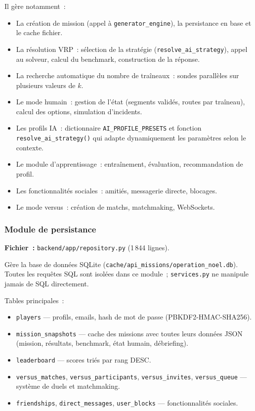\documentclass[a4paper, 12pt, twoside]{article}
\begin{document}
Il g\`{e}re notamment~:
\begin{itemize}
  \item La cr\'{e}ation de mission (appel \`{a} \texttt{generator\_engine}), la persistance en base et le cache fichier.
  \item La r\'{e}solution VRP~: s\'{e}lection de la strat\'{e}gie (\texttt{resolve\_ai\_strategy}), appel au solveur, calcul du benchmark, construction de la r\'{e}ponse.
  \item La recherche automatique du nombre de tra\^{i}neaux~: sondes parall\`{e}les sur plusieurs valeurs de $k$.
  \item Le mode humain~: gestion de l'\'{e}tat (segments valid\'{e}s, routes par tra\^{i}neau), calcul des options, simulation d'incidents.
  \item Les profils IA~: dictionnaire \texttt{AI\_PROFILE\_PRESETS} et fonction \texttt{resolve\_ai\_strategy()} qui adapte dynamiquement les param\`{e}tres selon le contexte.
  \item Le module d'apprentissage~: entra\^{i}nement, \'{e}valuation, recommandation de profil.
  \item Les fonctionnalit\'{e}s sociales~: amiti\'{e}s, messagerie directe, blocages.
  \item Le mode versus~: cr\'{e}ation de matchs, matchmaking, WebSockets.
\end{itemize}

\subsubsection{Module de persistance}

\textbf{Fichier~:} \texttt{backend/app/repository.py} (1\,844 lignes).

G\`{e}re la base de donn\'{e}es SQLite (\texttt{cache/api\_missions/operation\_noel.db}).
Toutes les requ\^{e}tes SQL sont isol\'{e}es dans ce module~; \texttt{services.py} ne
manipule jamais de SQL directement.

Tables principales~:
\begin{itemize}
  \item \texttt{players} --- profils, emails, hash de mot de passe (PBKDF2-HMAC-SHA256).
  \item \texttt{mission\_snapshots} --- cache des missions avec toutes leurs donn\'{e}es JSON (mission, r\'{e}sultats, benchmark, \'{e}tat humain, d\'{e}briefing).
  \item \texttt{leaderboard} --- scores tri\'{e}s par rang DESC.
  \item \texttt{versus\_matches}, \texttt{versus\_participants}, \texttt{versus\_invites}, \texttt{versus\_queue} --- syst\`{e}me de duels et matchmaking.
  \item \texttt{friendships}, \texttt{direct\_messages}, \texttt{user\_blocks} --- fonctionnalit\'{e}s sociales.
\end{itemize}
\end{document}
